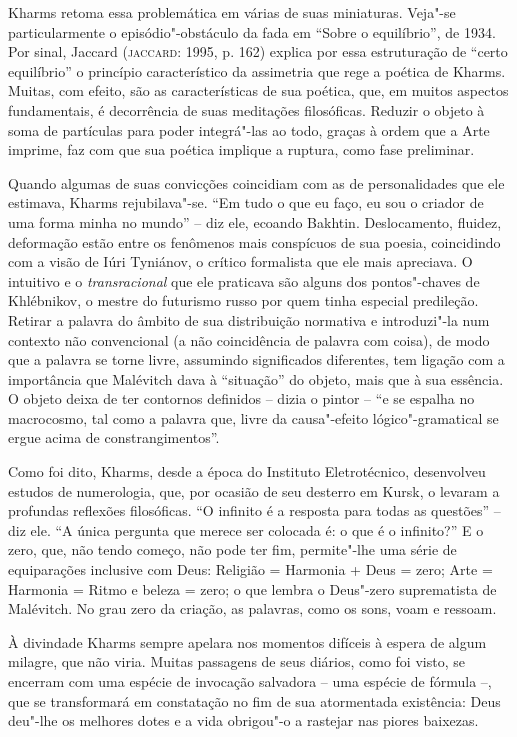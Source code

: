 Kharms retoma essa problemática em várias de suas miniaturas. Veja"-se
particularmente o episódio"-obstáculo da fada em ``Sobre o equilíbrio'',
de 1934. Por sinal, Jaccard (\textsc{jaccard}: 1995, p. 162) explica por
essa estruturação de ``certo equilíbrio'' o princípio característico da
assimetria que rege a poética de Kharms. Muitas, com efeito, são as
características de sua poética, que, em muitos aspectos fundamentais, é
decorrência de suas meditações filosóficas. Reduzir o objeto à soma de
partículas para poder integrá"-las ao todo, graças à ordem que a Arte
imprime, faz com que sua poética implique a ruptura, como fase
preliminar.

Quando algumas de suas convicções coincidiam com as de personalidades
que ele estimava, Kharms rejubilava"-se. ``Em tudo o que eu faço, eu sou
o criador de uma forma minha no mundo'' -- diz ele, ecoando Bakhtin.
Deslocamento, fluidez, deformação estão entre os fenômenos mais
conspícuos de sua poesia, coincidindo com a visão de Iúri Tyniánov, o
crítico formalista que ele mais apreciava. O intuitivo e o
\emph{transracional} que ele praticava são alguns dos pontos"-chaves de
Khlébnikov, o mestre do futurismo russo por quem tinha especial
predileção. Retirar a palavra do âmbito de sua distribuição normativa e
introduzi"-la num contexto não convencional (a não coincidência de
palavra com coisa), de modo que a palavra se torne livre, assumindo
significados diferentes, tem ligação com a importância que Malévitch
dava à ``situação'' do objeto, mais que à sua essência. O objeto deixa
de ter contornos definidos -- dizia o pintor -- ``e se espalha no
macrocosmo, tal como a palavra que, livre da causa"-efeito
lógico"-gramatical se ergue acima de constrangimentos''.

Como foi dito, Kharms, desde a época do Instituto Eletrotécnico,
desenvolveu estudos de numerologia, que, por ocasião de seu desterro em
Kursk, o levaram a profundas reflexões filosóficas. ``O infinito é a
resposta para todas as questões'' -- diz ele. ``A única pergunta que
merece ser colocada é: o que é o infinito?'' E o zero, que, não tendo
começo, não pode ter fim, permite"-lhe uma série de equiparações
inclusive com Deus: Religião = Harmonia + Deus = zero; Arte = Harmonia =
Ritmo e beleza = zero; o que lembra o Deus"-zero suprematista de
Malévitch. No grau zero da criação, as palavras, como os sons, voam e
ressoam.

À divindade Kharms sempre apelara nos momentos difíceis à espera de
algum milagre, que não viria. Muitas passagens de seus diários, como foi
visto, se encerram com uma espécie de invocação salvadora -- uma espécie
de fórmula --, que se transformará em constatação no fim de sua
atormentada existência: Deus deu"-lhe os melhores dotes e a vida
obrigou"-o a rastejar nas piores baixezas.

